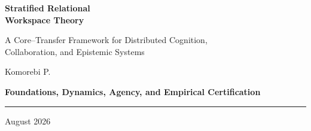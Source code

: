 
\begin{titlepage}
\thispagestyle{empty}
\centering
\vspace*{1.2in}
{\Huge\bfseries\color{PartColor} Stratified Relational\\[0.18em] Workspace Theory\par}
\vspace{0.55in}
{\Large A Core--Transfer Framework for Distributed Cognition,\\ Collaboration, and Epistemic Systems\par}
\vspace{0.8in}
{\large Komorebi P.\par}
\vspace{0.65in}
{\large\bfseries Foundations, Dynamics, Agency, and Empirical Certification\par}
\vfill
{\color{RuleColor}\rule{0.70\textwidth}{0.8pt}\par}
\vspace{0.25in}
{\small August 2026\par}
\end{titlepage}
\clearpage
{}

